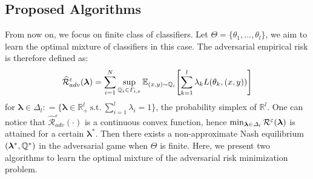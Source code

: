 \subsection{Proposed Algorithms}
\label{sec:proposed-algo}
From now on, we focus on finite class of classifiers. Let $\Theta = \{\theta_1,\dots,\theta_l\}$, we aim to learn the optimal mixture of classifiers in this case. The adversarial empirical risk  is therefore defined as:
\begin{align*}
    \widehat{\mathcal{R}}_{adv}^\varepsilon(\bm{\lambda})= \sum_{i=1}^\numsamples\sup_{\QQ_i\in\Gamma_{i,\varepsilon}}\mathbb{E}_{(x,y)\sim \QQ_i}\left[\sum_{k=1}^l \lambda_k \loss(\theta_k,(x,y))\right]
\end{align*}
for $\bm{\lambda}\in\Delta_l: = \{\bm{\lambda}\in\mathbb{R}_+^l~\mathrm{s.t.}~\sum_{i=1}^l\lambda_i=1\}$, the probability simplex of $\mathbb{R}^l$. One can notice that $ \widehat{\mathcal{R}}_{adv}^\varepsilon(\cdot)$ is a continuous convex function, hence $\min_{\bm{\lambda}\in\Delta_l}\mathcal{R}^\varepsilon(\bm{\lambda})$ is attained for a certain $\bm{\lambda}^*$. Then there exists a non-approximate Nash equilibrium $(\bm{\lambda}^*,\mathbb{Q}^*)$ in the adversarial game when $\Theta$ is finite. Here, we present two algorithms to learn the optimal mixture of the adversarial risk minimization problem.


